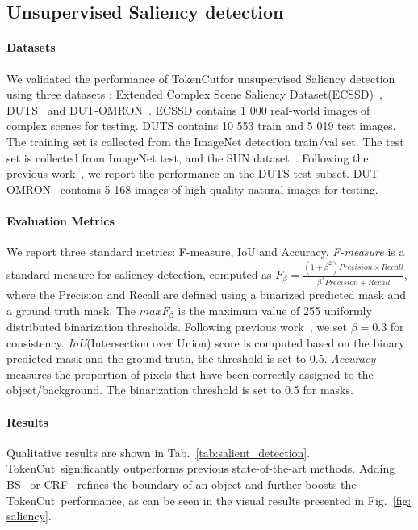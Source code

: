 \documentclass[twocolumn]{article}
\newcommand{\name} {TokenCut}
\begin{document}
\subsection{Unsupervised Saliency detection}
\label{sec:unsupervised_saliency_detection}

\paragraph*{Datasets}
We validated the performance of \name for unsupervised Saliency detection using three datasets : Extended Complex Scene Saliency Dataset(ECSSD)~\cite{shi2015hierarchical}, DUTS~\cite{wang2017learning} and DUT-OMRON~\cite{yang2013saliency}. ECSSD contains 1 000 real-world images of complex scenes for testing. 
DUTS contains 10 553 train and 5 019 test images. The training set is collected from the ImageNet detection train/val set. The test set is collected from ImageNet test, and the SUN dataset~\cite{Xiao2010Sun}. Following the previous work~\cite{shen2021learning}, we report the performance on the DUTS-test subset. DUT-OMRON~\cite{yang2013saliency} contains 5 168 images of high quality natural images for testing.

\paragraph*{Evaluation Metrics}
We report three standard metrics: F-measure, IoU and Accuracy. \textit{F-measure} is a standard measure for saliency detection, computed as $F_\beta = \frac{(1+\beta^2)Precision \times Recall}{\beta^2Precision + Recall}$, where the Precision and Recall are defined using a binarized predicted mask and a ground truth mask. The $maxF_{\beta}$ is the maximum value of 255 uniformly distributed binarization thresholds. Following previous work~\cite{shen2021learning,voynov2021object}, we set $\beta=0.3$ for consistency. \textit{IoU}(Intersection over Union) score is computed based on the binary predicted mask and the ground-truth, the threshold is set to 0.5. \textit{Accuracy} measures the proportion of pixels that have been correctly assigned to the object/background. The binarization threshold is set to 0.5 for masks. 
 

\paragraph*{Results}
Qualitative results are shown in Tab.~\ref{tab:salient_detection}. \name~significantly outperforms previous state-of-the-art methods. Adding BS~\cite{barron2016fast} or CRF~\cite{krahenbuhl2011efficient} refines the boundary of an object and further boosts the \name~performance, as can  be seen in the visual results presented in Fig.~\ref{fig: saliency}.
\end{document}
